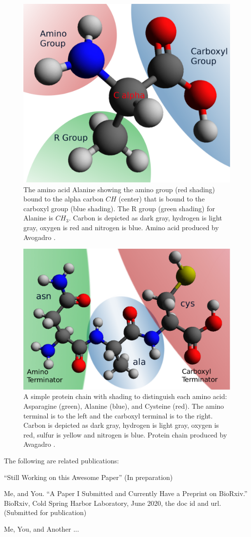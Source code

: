 \begin{figure}[h!]
\centering
\includegraphics[width=0.7\linewidth]{images/ALA2}
\caption{The amino acid Alanine showing the amino group (red shading) bound to the alpha carbon $CH$ (center) that is bound to the carboxyl group (blue shading). The R group (green shading)  for Alanine is $CH_3$. Carbon is depicted as dark gray, hydrogen is light gray, oxygen is red and nitrogen is blue. Amino acid produced by Avogadro \citep{Hanwell2012}.}
\label{fig:ala}
\end{figure}

\begin{figure}[h!]
\centering
\includegraphics[width=0.7\linewidth]{images/ASN-ALA-CYS}
\caption{A simple protein chain with shading to distinguish each amino acid: Asparagine (green), Alanine (blue), and Cysteine (red). The amino terminal is to the left and the carboxyl terminal is to the right. Carbon is depicted as dark gray, hydrogen is light gray, oxygen is red, sulfur is yellow and nitrogen is blue. Protein chain produced by Avagadro \citep{Hanwell2012}.}
\label{fig:ASN-ALA-CYS}
\end{figure}


\noindent The following are related publications:

\begin{list}{}{}
	\item “Still Working on this Awesome Paper” (In preparation)

	\item Me, and You. “A Paper I Submitted and Currently Have a Preprint on BioRxiv.” BioRxiv, Cold Spring Harbor Laboratory, June 2020, the doc id and url. (Submitted for publication)

	\item Me, You, and Another ...

\end{list}

